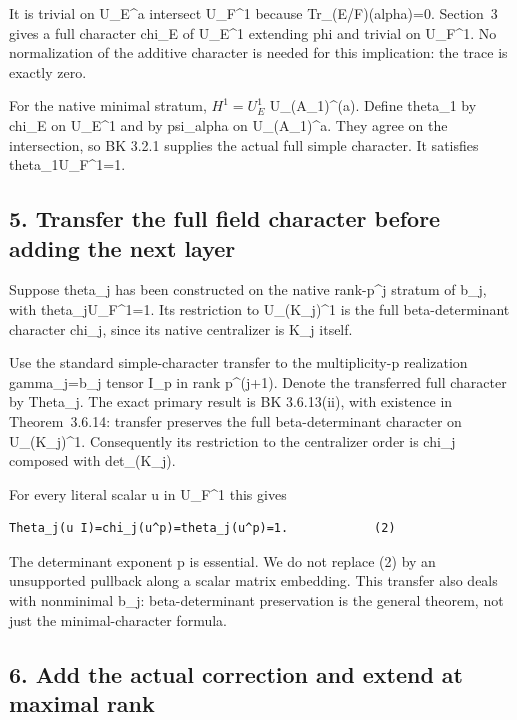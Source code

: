 It is trivial on U\_E\^{}a intersect U\_F\^{}1 because
Tr\_(E/F)(alpha)=0. Section~3 gives a full character chi\_E of U\_E\^{}1
extending phi and trivial on U\_F\^{}1. No normalization of the additive character is needed for this implication: the trace is exactly zero.

For the native minimal stratum, \(H^1=U_E^1\)
U\_(A\_1)\^{}(a). Define theta\_1 by chi\_E on U\_E\^{}1 and by
psi\_alpha on U\_(A\_1)\^{}a. They agree on the intersection, so BK 3.2.1
supplies the actual full simple character. It satisfies
theta\_1\textbar U\_F\^{}1=1.

\hypertarget{odd_character-transfer-the-full-field-character-before-adding-the-next-layer}{%
\subsection{5. Transfer the full field character before adding the next
layer}\label{odd_character-transfer-the-full-field-character-before-adding-the-next-layer}}

Suppose theta\_j has been constructed on the native rank-p\^{}j stratum
of b\_j, with theta\_j\textbar U\_F\^{}1=1. Its restriction to
U\_(K\_j)\^{}1 is the full beta-determinant character chi\_j, since its
native centralizer is K\_j itself.

Use the standard simple-character transfer to the multiplicity-p
realization gamma\_j=b\_j tensor I\_p in rank p\^{}(j+1). Denote the
transferred full character by Theta\_j. The exact primary result is
BK 3.6.13(ii), with existence in Theorem~3.6.14: transfer preserves the
full beta-determinant character on U\_(K\_j)\^{}1. Consequently its
restriction to the centralizer order is chi\_j composed with
det\_(K\_j).

For every literal scalar u in U\_F\^{}1 this gives

\begin{Verbatim}[fontsize=\small,breaklines=true,breakanywhere=true]
Theta_j(u I)=chi_j(u^p)=theta_j(u^p)=1.            (2)
\end{Verbatim}

The determinant exponent p is essential. We do not replace (2) by an
unsupported pullback along a scalar matrix embedding. This transfer also
deals with nonminimal b\_j: beta-determinant preservation is the general
theorem, not just the minimal-character formula.

\hypertarget{odd_character-add-the-actual-correction-and-extend-at-maximal-rank}{%
\subsection{6. Add the actual correction and extend at maximal
rank}\label{odd_character-add-the-actual-correction-and-extend-at-maximal-rank}}

